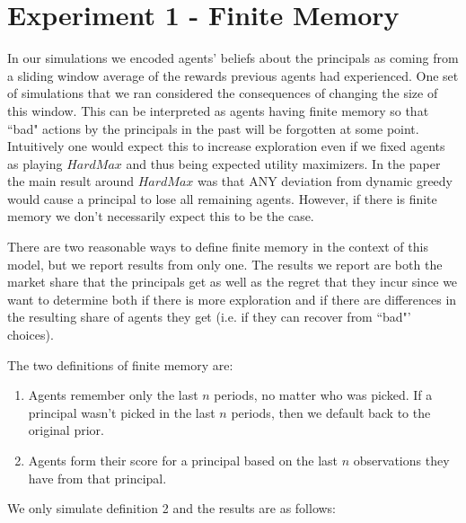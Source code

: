 \documentclass[11pt,letterpaper]{article}
\begin{document}
\section*{Experiment 1 - Finite Memory}
In our simulations we encoded agents' beliefs about the principals as coming from a sliding window average of the rewards previous agents had experienced. One set of simulations that we ran considered the consequences of changing the size of this window. This can be interpreted as agents having finite memory so that ``bad" actions by the principals in the past will be forgotten at some point. Intuitively one would expect this to increase exploration even if we fixed agents as playing $HardMax$ and thus being expected utility maximizers. In the paper the main result around $HardMax$ was that ANY deviation from dynamic greedy would cause a principal to lose all remaining agents. However, if there is finite memory we don't necessarily expect this to be the case.

There are two reasonable ways to define finite memory in the context of this model, but we report results from only one. The results we report are both the market share that the principals get as well as the regret that they incur since we want to determine both if there is more exploration and if there are differences in the resulting share of agents they get (i.e. if they can recover from ``bad"' choices).

The two definitions of finite memory are:
\begin{enumerate}
\item Agents remember only the last $n$ periods, no matter who was picked. If a principal wasn't picked in the last $n$ periods, then we default back to the original prior.
\item Agents form their score for a principal based on the last $n$ observations they have from that principal.
\end{enumerate}

We only simulate definition 2 and the results are as follows:
\end{document}
